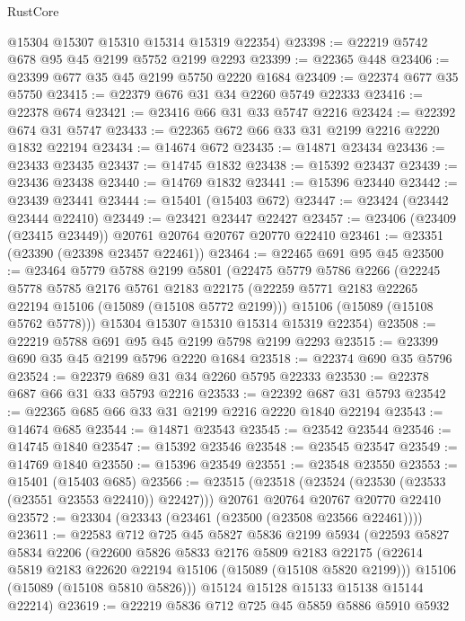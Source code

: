 \begin{lexlean}{RustCore}
\begin{coremodule}
      @15304
      @15307
      @15310
      @15314
      @15319
      @22354)
@23398 := @22219 @5742 @678 @95 @45 @2199 @5752 @2199 @2293
@23399 := @22365 @448
@23406 := @23399 @677 @35 @45 @2199 @5750 @2220 @1684
@23409 := @22374 @677 @35 @5750
@23415 := @22379 @676 @31 @34 @2260 @5749 @22333
@23416 := @22378 @674
@23421 := @23416 @66 @31 @33 @5747 @2216
@23424 := @22392 @674 @31 @5747
@23433 := @22365 @672 @66 @33 @31 @2199 @2216 @2220 @1832 @22194
@23434 := @14674 @672
@23435 := @14871 @23434
@23436 := @23433 @23435
@23437 := @14745 @1832
@23438 := @15392 @23437
@23439 := @23436 @23438
@23440 := @14769 @1832
@23441 := @15396 @23440
@23442 := @23439 @23441
@23444 := @15401 (@15403 @672)
@23447 := @23424 (@23442 @23444 @22410)
@23449 := @23421 @23447 @22427
@23457 := @23406 (@23409 (@23415 @23449)) @20761 @20764 @20767 @20770 @22410
@23461 := @23351 (@23390 (@23398 @23457 @22461))
@23464 := @22465 @691 @95 @45
@23500 := @23464
    @5779
    @5788
    @2199
    @5801
    (@22475
      @5779
      @5786
      @2266
      (@22245
        @5778
        @5785
        @2176
        @5761
        @2183
        @22175
        (@22259 @5771 @2183 @22265 @22194 @15106 (@15089 (@15108 @5772 @2199)))
        @15106
        (@15089 (@15108 @5762 @5778)))
      @15304
      @15307
      @15310
      @15314
      @15319
      @22354)
@23508 := @22219 @5788 @691 @95 @45 @2199 @5798 @2199 @2293
@23515 := @23399 @690 @35 @45 @2199 @5796 @2220 @1684
@23518 := @22374 @690 @35 @5796
@23524 := @22379 @689 @31 @34 @2260 @5795 @22333
@23530 := @22378 @687 @66 @31 @33 @5793 @2216
@23533 := @22392 @687 @31 @5793
@23542 := @22365 @685 @66 @33 @31 @2199 @2216 @2220 @1840 @22194
@23543 := @14674 @685
@23544 := @14871 @23543
@23545 := @23542 @23544
@23546 := @14745 @1840
@23547 := @15392 @23546
@23548 := @23545 @23547
@23549 := @14769 @1840
@23550 := @15396 @23549
@23551 := @23548 @23550
@23553 := @15401 (@15403 @685)
@23566 := @23515
    (@23518 (@23524 (@23530 (@23533 (@23551 @23553 @22410)) @22427)))
    @20761
    @20764
    @20767
    @20770
    @22410
@23572 := @23304 (@23343 (@23461 (@23500 (@23508 @23566 @22461))))
@23611 := @22583
    @712
    @725
    @45
    @5827
    @5836
    @2199
    @5934
    (@22593
      @5827
      @5834
      @2206
      (@22600
        @5826
        @5833
        @2176
        @5809
        @2183
        @22175
        (@22614 @5819 @2183 @22620 @22194 @15106 (@15089 (@15108 @5820 @2199)))
        @15106
        (@15089 (@15108 @5810 @5826)))
      @15124
      @15128
      @15133
      @15138
      @15144
      @22214)
@23619 := @22219 @5836 @712 @725 @45 @5859 @5886 @5910 @5932

\end{coremodule}
\end{lexlean}
